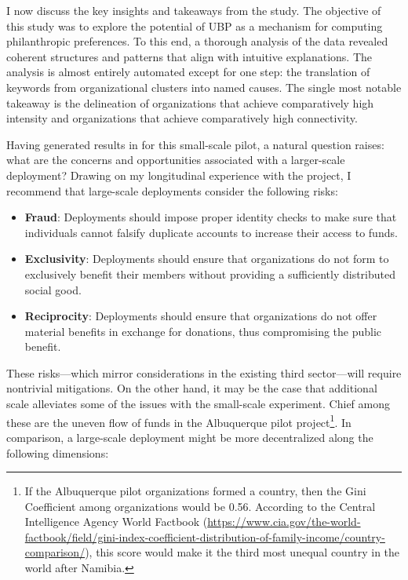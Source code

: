 I now discuss the key insights and takeaways from the study.
The objective of this study was to explore the potential of UBP as a mechanism for computing philanthropic preferences.
To this end, a thorough analysis of the data revealed coherent structures and patterns that align with intuitive explanations.
The analysis is almost entirely automated except for one step: the translation of keywords from organizational clusters into named causes.
The single most notable takeaway is the delineation of organizations that achieve comparatively high intensity and organizations that achieve comparatively high connectivity.

Having generated results in for this small-scale pilot, a natural question raises: what are the concerns and opportunities associated with a larger-scale deployment?
Drawing on my longitudinal experience with the project, I recommend that large-scale deployments consider the following risks:

\begin{itemize}
  \item \textbf{Fraud}: Deployments should impose proper identity checks to make sure that individuals cannot falsify duplicate accounts to increase their access to funds.
  \item \textbf{Exclusivity}: Deployments should ensure that organizations do not form to exclusively benefit their members without providing a sufficiently distributed social good.
  \item \textbf{Reciprocity}: Deployments should ensure that organizations do not offer material benefits in exchange for donations, thus compromising the public benefit.
\end{itemize}

These risks---which mirror considerations in the existing third sector---will require nontrivial mitigations.
On the other hand, it may be the case that additional scale alleviates some of the issues with the small-scale experiment.
Chief among these are the uneven flow of funds in the Albuquerque pilot project\footnote{If the Albuquerque pilot organizations formed a country, then the Gini Coefficient among organizations would be 0.56. According to the Central Intelligence Agency World Factbook (\url{https://www.cia.gov/the-world-factbook/field/gini-index-coefficient-distribution-of-family-income/country-comparison/}), this score would make it the third most unequal country in the world after Namibia.}.
In comparison, a large-scale deployment might be more decentralized along the following dimensions:

